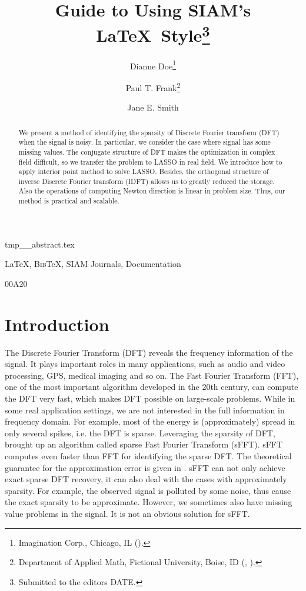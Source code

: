 \documentclass[final,onefignum,onetabnum]{siamart190516}
\title{Guide to Using SIAM's \LaTeX\ Style\thanks{Submitted to the editors DATE.
\funding{Funding information goes here.}}}
\author{Dianne Doe\thanks{Imagination Corp., Chicago, IL (\email{ddoe@imag.com}).}
\and Paul T. Frank\thanks{Department of Applied Math, Fictional University, Boise, ID (\email{ptfrank@fictional.edu}, \email{jesmith@fictional.edu}).}
\and Jane E. Smith\footnotemark[3]}
\newcommand{\BibTeX}{{\scshape Bib}\TeX\xspace}
\newcounter{example}
\begin{document}
\maketitle

\begin{tcbverbatimwrite}{tmp_\jobname_abstract.tex}
\begin{abstract}
We present a method of identifying the sparsity of Discrete Fourier transform (DFT) when the signal is noisy. In particular, we consider the case where signal has some missing values. The conjugate structure of DFT makes the optimization in complex field difficult, so we transfer the problem to LASSO in real field. We introduce how to apply interior point method to solve LASSO. Besides, the orthogonal structure of inverse Discrete Fourier transform (IDFT) allows us to greatly reduced the storage. Also the operations of computing Newton direction is linear in problem size. Thus, our method is practical and scalable. 
\end{abstract}

\begin{keywords}
  \LaTeX, \BibTeX, SIAM Journals, Documentation 
\end{keywords}

\begin{AMS}
  00A20 
\end{AMS}
\end{tcbverbatimwrite}

\section{Introduction}
The Discrete Fourier Transform (DFT) reveals the frequency information of the signal. It plays important roles in many applications, such as audio and video processing, GPS, medical imaging and so on. The Fast Fourier Transform (FFT), one of the most important algorithm developed in the 20th century, can compute the DFT very fast, which makes DFT possible on large-scale problems. While in some real application settings, we are not interested in the full information in frequency domain. For example, most of the energy is (approximately) spread in only several spikes, i.e. the DFT is sparse. Leveraging the sparsity of DFT, \cite{hassanieh2012simple} brought up an algorithm called sparse Fast Fourier Transform (sFFT). sFFT computes even faster than FFT for identifying the sparse DFT. The theoretical guarantee for the approximation error is given in \cite{hassanieh2012nearly}. sFFT can not only achieve exact sparse DFT recovery, it can also deal with the cases with approximately sparsity. For example, the observed signal is polluted by some noise, thus cause the exact sparsity to be approximate. However, we sometimes also have missing value problems in the signal. It is not an obvious solution for sFFT.
\end{document}
